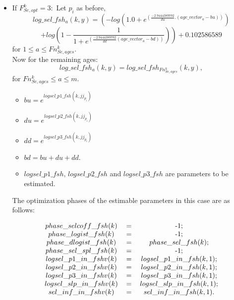 \documentclass{article}
\begin{document}
\begin{itemize}
        
\item If $F^k_{Se,opt}=3:$ Let $p_i$ as before,
 \begin{equation}
        log\_sel\_fsh_a(k,y)     = \left( -log(1.0 + e^{(\frac{-2.9444389792}{du}.( age\_vector_a - bu) )}) \right.
    \end{equation}
    \begin{equation*}
         \left.+log\left(1 - \dfrac{1}{1 + e^{\left(\frac{-2.9444389792}{dd} ( age\_vector_a - bd)\right)}} \right) \right)+0.102586589 
    \end{equation*}
      for $1\leq a \leq Fn_{Se,ages}^k$.\\
      Now for the remaining ages:
    \begin{equation}
        log\_sel\_fsh_a(k,y) = log\_sel\_fsh_{Fn_{Se,ages}^k}(k,y),
    \end{equation}
    for $Fn_{Se,ages}^k\leq a \leq m$.
    \begin{itemize}
        \item %
        $bu = e^{logsel\_p1\_fsh(k,jj_{p_i})}$
        \item 
        $du = e^{logsel\_p2\_fsh(k,jj_{p_i})}$
        \item
        $dd = e^{logsel\_p3\_fsh(k,jj_{p_i})}$
        \item $bd = bu + du + dd$.
        \item $logsel\_p1\_fsh$, $logsel\_p2\_fsh$ and $logsel\_p3\_fsh$ are parameters to be estimated.
    \end{itemize}
    The optimization phases of the estimable parameters in this case are as follows:
\begin{table}[H]
    \centering
    \begin{equation}
    \begin{tabular}{c c c}
       $phase\_selcoff\_fsh(k)$ &= &-1;\\
       $ phase\_logist\_fsh(k)$ & = &-1;
\\        $phase\_dlogist\_fsh(k)$& = & $phase\_sel\_fsh(k)$;\\
        $phase\_sel\_spl\_fsh(k)$ & =& -1;\\

        $logsel\_p1\_in\_fshv(k)$& = & $logsel\_p1\_in\_fsh(k,1)$;\\
        $logsel\_p2\_in\_fshv(k)$& = & $logsel\_p2\_in\_fsh(k,1)$;\\
        $logsel\_p3\_in\_fshv(k)$ &= & $logsel\_p3\_in\_fsh(k,1)$;\\

        $logsel\_slp\_in\_fshv(k)$& = &$logsel\_slp\_in\_fsh(k,1)$;\\
           $sel\_inf\_in\_fshv(k)$& =  &  $sel\_inf\_in\_fsh(k,1)$.
    \end{tabular}
    \end{equation}
    \label{tab: phase3}
\end{table}

    \end{itemize}
\end{document}
